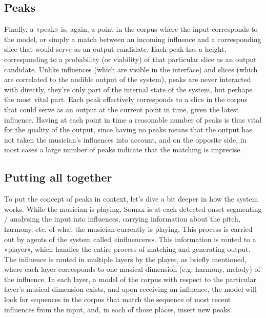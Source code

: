 \subsection{Peaks}
Finally, a «peak» is, again, a point in the corpus where the input corresponds to the model, or simply a match between an incoming influence and a corresponding slice that would serve as an output candidate. Each peak has a height, corresponding to a probability (or viability) of that particular slice as an output candidate. Unlike influences (which are visible in the interface) and slices (which are correlated to the audible output of the system), peaks are never interacted with directly, they're only part of the internal state of the system, but perhaps the most vital part. Each peak effectively corresponds to a slice in the corpus that could serve as an output at the current point in time, given the latest influence. Having at each point in time a reasonable number of peaks is thus vital for the quality of the output, since having no peaks means that the output has not taken the musician's influences into account, and on the opposite side, in most cases a large number of peaks indicate that the matching is imprecise. 

\subsection{Putting all together}\label{sec:all_together}
To put the concept of peaks in context, let's dive a bit deeper in how the system works. While the musician is playing, Somax is at each detected onset segmenting / analysing the input into influences, carrying information about the pitch, harmony, etc. of what the musician currently is playing. This process is carried out by agents of the system called «influencers». This information is routed to a «player», which handles the entire process of matching and generating output. The influence is routed in multiple layers by the player, as briefly mentioned, where each layer corresponds to one musical dimension (e.g. harmony, melody) of the influence. In each layer, a model of the corpus with respect to the particular layer's musical dimension exists, and upon receiving an influence, the model will look for sequences in the corpus that match the sequence of most recent influences from the input, and, in each of those places,  insert new peaks. 

